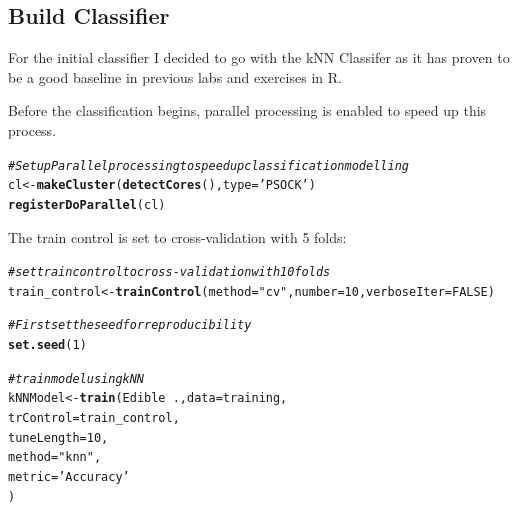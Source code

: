 \documentclass[10pt  ,usenames, dvipsnames]{article}\usepackage[]{graphicx}\usepackage[]{color}
\makeatletter
\newcommand{\hlnum}[1]{\textcolor[rgb]{0.686,0.059,0.569}{#1}}%
\newcommand{\hlstr}[1]{\textcolor[rgb]{0.192,0.494,0.8}{#1}}%
\newcommand{\hlcom}[1]{\textcolor[rgb]{0.678,0.584,0.686}{\textit{#1}}}%
\newcommand{\hlopt}[1]{\textcolor[rgb]{0,0,0}{#1}}%
\newcommand{\hlstd}[1]{\textcolor[rgb]{0.345,0.345,0.345}{#1}}%
\newcommand{\hlkwb}[1]{\textcolor[rgb]{0.69,0.353,0.396}{#1}}%
\newcommand{\hlkwc}[1]{\textcolor[rgb]{0.333,0.667,0.333}{#1}}%
\newcommand{\hlkwd}[1]{\textcolor[rgb]{0.737,0.353,0.396}{\textbf{#1}}}%
\newenvironment{kframe}{%
 \def\at@end@of@kframe{}%
 \ifinner\ifhmode%
  \def\at@end@of@kframe{\end{minipage}}%
  \begin{minipage}{\columnwidth}%
 \fi\fi%
 \def\FrameCommand##1{\hskip\@totalleftmargin \hskip-\fboxsep
 \colorbox{shadecolor}{##1}\hskip-\fboxsep
     \hskip-\linewidth \hskip-\@totalleftmargin \hskip\columnwidth}%
 \MakeFramed {\advance\hsize-\width
   \@totalleftmargin\z@ \linewidth\hsize
   \@setminipage}}%
 {\par\unskip\endMakeFramed%
 \at@end@of@kframe}
\newenvironment{knitrout}{}{} %
\makeatother
\begin{document}
\subsection{Build Classifier}

For the initial classifier I decided to go with the kNN Classifer as it has proven to be a good baseline in previous labs and exercises in R.


Before the classification begins, parallel processing is enabled to speed up this process.

\begin{knitrout}
\color{fgcolor}\begin{kframe}
\begin{alltt}
\hlcom{#Setup Parallel processing to speed up classification modelling }
\hlstd{cl} \hlkwb{<-} \hlkwd{makeCluster}\hlstd{(}\hlkwd{detectCores}\hlstd{(),} \hlkwc{type}\hlstd{=}\hlstr{'PSOCK'}\hlstd{)}
\hlkwd{registerDoParallel}\hlstd{(cl)}
\end{alltt}
\end{kframe}
\end{knitrout}



The train control is set to cross-validation with 5 folds:
\begin{knitrout}
\color{fgcolor}\begin{kframe}
\begin{alltt}
\hlcom{#set train control to cross-validation with 10 folds}
\hlstd{train_control}\hlkwb{<-} \hlkwd{trainControl}\hlstd{(}\hlkwc{method}\hlstd{=}\hlstr{"cv"}\hlstd{,} \hlkwc{number}\hlstd{=}\hlnum{10}\hlstd{,}\hlkwc{verboseIter}\hlstd{=}\hlnum{FALSE}\hlstd{)}
\end{alltt}
\end{kframe}
\end{knitrout}



% 
\begin{knitrout}
\color{fgcolor}\begin{kframe}
\begin{alltt}
\hlcom{#First set the seed for reproducibility}
\hlkwd{set.seed}\hlstd{(}\hlnum{1}\hlstd{)}

\hlcom{#train model using kNN}
\hlstd{kNNModel} \hlkwb{<-} \hlkwd{train}\hlstd{(Edible} \hlopt{~} \hlstd{.,} \hlkwc{data} \hlstd{= training,}
                  \hlkwc{trControl} \hlstd{= train_control,}
                  \hlkwc{tuneLength} \hlstd{=}\hlnum{10}\hlstd{,}
                  \hlkwc{method} \hlstd{=} \hlstr{"knn"}\hlstd{,}
                  \hlkwc{metric} \hlstd{=} \hlstr{'Accuracy'}
\hlstd{)}
\end{alltt}
\end{kframe}
\end{knitrout}
\end{document}
